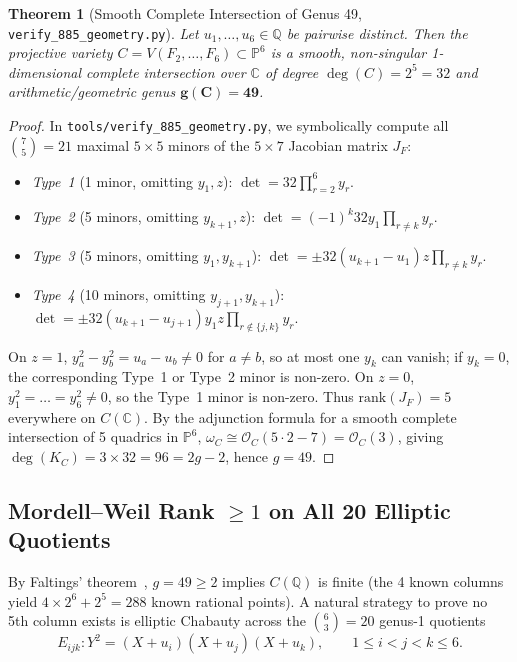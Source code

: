 \documentclass[10pt,twocolumn]{article}
\newtheorem{theorem}{Theorem}[section]
\theoremstyle{definition}
\begin{document}
\begin{theorem}[Smooth Complete Intersection of Genus 49, \texttt{verify\_885\_geometry.py}]
Let $u_1, \dots, u_6 \in \mathbb{Q}$ be pairwise distinct. Then the projective variety $C = V(F_2,\dots,F_6) \subset \mathbb{P}^6$ is a smooth, non-singular 1-dimensional complete intersection over $\mathbb{C}$ of degree $\deg(C) = 2^5 = 32$ and arithmetic/geometric genus $\mathbf{g(C) = 49}$.
\end{theorem}
\begin{proof}
In \texttt{tools/verify\_885\_geometry.py}, we symbolically compute all $\binom{7}{5} = 21$ maximal $5 \times 5$ minors of the $5 \times 7$ Jacobian matrix $J_F$:
\begin{itemize}[leftmargin=1.4em,itemsep=1pt]
  \item \emph{Type~1} (1 minor, omitting $y_1, z$): $\det = 32 \prod_{r=2}^6 y_r$.
  \item \emph{Type~2} (5 minors, omitting $y_{k+1}, z$): $\det = (-1)^k 32 y_1 \prod_{r \neq k} y_r$.
  \item \emph{Type~3} (5 minors, omitting $y_1, y_{k+1}$): $\det = \pm 32(u_{k+1}-u_1)z\prod_{r \neq k} y_r$.
  \item \emph{Type~4} (10 minors, omitting $y_{j+1}, y_{k+1}$): $\det = \pm 32(u_{k+1}-u_{j+1})y_1 z\prod_{r \notin \{j,k\}} y_r$.
\end{itemize}
On $z = 1$, $y_a^2 - y_b^2 = u_a - u_b \neq 0$ for $a \neq b$, so at most one $y_k$ can vanish; if $y_k = 0$, the corresponding Type~1 or Type~2 minor is non-zero. On $z = 0$, $y_1^2 = \dots = y_6^2 \neq 0$, so the Type~1 minor is non-zero. Thus $\mathrm{rank}(J_F) = 5$ everywhere on $C(\mathbb{C})$. By the adjunction formula for a smooth complete intersection of 5 quadrics in $\mathbb{P}^6$, $\omega_C \cong \mathcal{O}_C(5\cdot 2 - 7) = \mathcal{O}_C(3)$, giving $\deg(K_C) = 3 \times 32 = 96 = 2g - 2$, hence $g = 49$.
\end{proof}

\subsection{Mordell--Weil Rank $\ge 1$ on All 20 Elliptic Quotients}
By Faltings' theorem~\cite{Faltings1983}, $g = 49 \ge 2$ implies $C(\mathbb{Q})$ is finite (the 4 known columns yield $4 \times 2^6 + 2^5 = 288$ known rational points). A natural strategy to prove no 5th column exists is elliptic Chabauty across the $\binom{6}{3} = 20$ genus-1 quotients
\begin{equation}
  E_{ijk} : Y^2 = (X + u_i)(X + u_j)(X + u_k), \qquad 1 \le i < j < k \le 6.
\end{equation}
\end{document}
